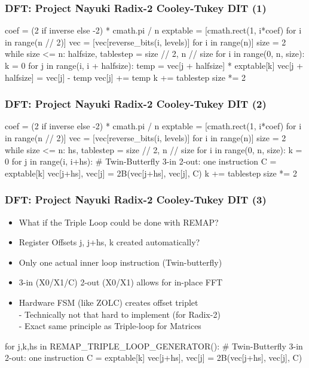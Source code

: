 \documentclass[slidestop]{beamer}
\begin{document}
\begin{frame}[fragile]
\frametitle{DFT: Project Nayuki Radix-2 Cooley-Tukey DIT (1)}

\begin{semiverbatim}
coef = (2 if inverse else -2) * cmath.pi / n
exptable = [cmath.rect(1, i*coef) for i in range(n // 2)]
vec = [vec[reverse_bits(i, levels)] for i in range(n)]
size = 2
while size <= n:
    halfsize, tablestep = size // 2, n // size
    for i in range(0, n, size):
        k = 0
        for j in range(i, i + halfsize):
            temp = vec[j + halfsize] * exptable[k]
            vec[j + halfsize] = vec[j] - temp
            vec[j] += temp
            k += tablestep
    size *= 2
\end{semiverbatim}

\end{frame}


\begin{frame}[fragile]
\frametitle{DFT: Project Nayuki Radix-2 Cooley-Tukey DIT (2)}

\begin{semiverbatim}
coef = (2 if inverse else -2) * cmath.pi / n
exptable = [cmath.rect(1, i*coef) for i in range(n // 2)]
vec = [vec[reverse_bits(i, levels)] for i in range(n)]
size = 2
while size <= n:
    hs, tablestep = size // 2, n // size
    for i in range(0, n, size):
        k = 0
        for j in range(i, i+hs):
            # Twin-Butterfly 3-in 2-out: one instruction
            C = exptable[k]
            vec[j+hs], vec[j] = 2B(vec[j+hs], vec[j], C)
            k += tablestep
    size *= 2
\end{semiverbatim}

\end{frame}

\begin{frame}[fragile]
\frametitle{DFT: Project Nayuki Radix-2 Cooley-Tukey DIT (3)}

 \begin{itemize}
    \item What if the Triple Loop could be done with REMAP?
    \item Register Offsets j, j+hs, k created automatically?
    \item Only one actual inner loop instruction (Twin-butterfly)
    \item 3-in (X0/X1/C) 2-out (X0/X1) allows for in-place FFT
    \item Hardware FSM (like ZOLC) creates offset triplet\\
        - Technically not that hard to implement (for Radix-2)\\
        - Exact same principle as Triple-loop for Matrices
  \end{itemize}

\begin{semiverbatim}
for j,k,hs in REMAP_TRIPLE_LOOP_GENERATOR():
            # Twin-Butterfly 3-in 2-out: one instruction
            C = exptable[k]
            vec[j+hs], vec[j] = 2B(vec[j+hs], vec[j], C)
\end{semiverbatim}

\end{frame}
\end{document}
